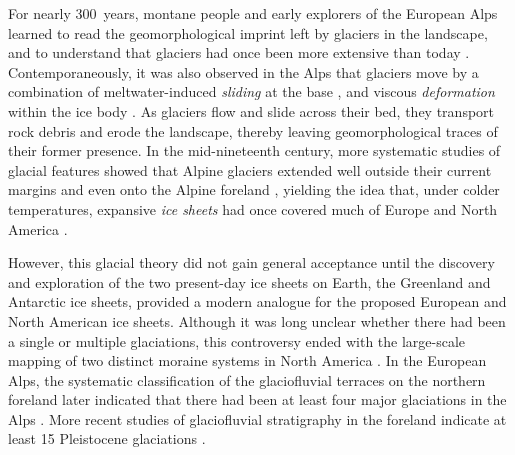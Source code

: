 \documentclass[tc, manuscript]{copernicus}
\begin{document}


\introduction
\label{sec:intro}

    For nearly 300~years, montane people and early explorers of the European
    Alps learned to read the geomorphological imprint left by glaciers in the
    landscape, and to understand that glaciers had once been more extensive
    than today \citep[e.g.,][p.~21]{Windham.Martel.1744}. Contemporaneously,
    it was also observed in the Alps that glaciers move by a combination of
    meltwater-induced \emph{sliding} at the base \citep[\S532]{Saussure.1779},
    and viscous \emph{deformation} within the ice body \citep{Forbes.1846b}. As
    glaciers flow and slide across their bed, they transport rock debris and
    erode the landscape, thereby leaving geomorphological traces of their
    former presence. In the mid-nineteenth
    century, more systematic studies of glacial features showed that Alpine
    glaciers extended well outside their current margins \citep{Venetz.1821}
    and even onto the Alpine foreland \citep{Charpentier.1841}, yielding the
    idea that, under colder temperatures, expansive \emph{ice sheets} had once
    covered much of Europe and North America \citep{Agassiz.1840}.

    However, this glacial theory did not gain general acceptance until the
    discovery and exploration of the two present-day ice sheets on Earth, the
    Greenland and Antarctic ice sheets, provided a modern analogue for the
    proposed European and North American ice sheets. Although it was long
    unclear whether there had been a single or multiple glaciations,
    this controversy ended with the large-scale mapping of two distinct moraine
    systems in North America \citep{Chamberlin.1894}. In the European Alps, the
    systematic classification of the glaciofluvial terraces on the northern
    foreland later indicated that there had been at least four major
    glaciations in the Alps \citep{Penck.Bruckner.1909}. More recent studies
    of glaciofluvial stratigraphy in the foreland indicate at least 15
    Pleistocene glaciations \citep{Schluchter.1988, Ivy-Ochs.etal.2008,
    Preusser.etal.2011}.
\end{document}
